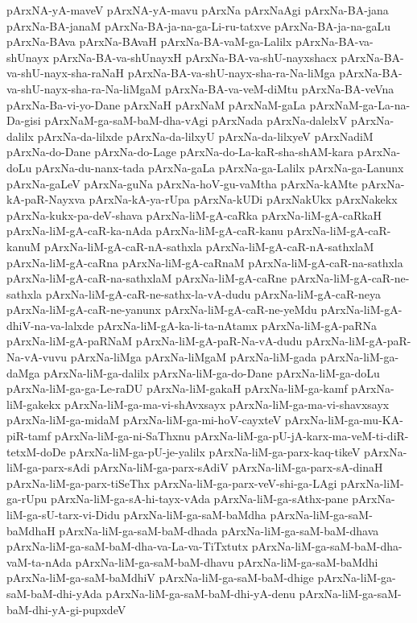 {pArxNA-yA-maveV
pArxNA-yA-mavu
pArxNa
pArxNaAgi
pArxNa-BA-jana
pArxNa-BA-janaM
pArxNa-BA-ja-na-ga-Li-ru-tatxve
pArxNa-BA-ja-na-gaLu
pArxNa-BAva
pArxNa-BAvaH
pArxNa-BA-vaM-ga-Lalilx
pArxNa-BA-va-shUnayx
pArxNa-BA-va-shUnayxH
pArxNa-BA-va-shU-nayxshacx
pArxNa-BA-va-shU-nayx-sha-raNaH
pArxNa-BA-va-shU-nayx-sha-ra-Na-liMga
pArxNa-BA-va-shU-nayx-sha-ra-Na-liMgaM
pArxNa-BA-va-veM-diMtu
pArxNa-BA-veVna
pArxNa-Ba-vi-yo-Dane
pArxNaH
pArxNaM
pArxNaM-gaLa
pArxNaM-ga-La-na-Da-gisi
pArxNaM-ga-saM-baM-dha-vAgi
pArxNada
pArxNa-dalelxV
pArxNa-dalilx
pArxNa-da-lilxde
pArxNa-da-lilxyU
pArxNa-da-lilxyeV
pArxNadiM
pArxNa-do-Dane
pArxNa-do-Lage
pArxNa-do-La-kaR-sha-shAM-kara
pArxNa-doLu
pArxNa-du-nanx-tada
pArxNa-gaLa
pArxNa-ga-Lalilx
pArxNa-ga-Lanunx
pArxNa-gaLeV
pArxNa-guNa
pArxNa-hoV-gu-vaMtha
pArxNa-kAMte
pArxNa-kA-paR-Nayxva
pArxNa-kA-ya-rUpa
pArxNa-kUDi
pArxNakUkx
pArxNakekx
pArxNa-kukx-pa-deV-shava
pArxNa-liM-gA-caRka
pArxNa-liM-gA-caRkaH
pArxNa-liM-gA-caR-ka-nAda
pArxNa-liM-gA-caR-kanu
pArxNa-liM-gA-caR-kanuM
pArxNa-liM-gA-caR-nA-sathxla
pArxNa-liM-gA-caR-nA-sathxlaM
pArxNa-liM-gA-caRna
pArxNa-liM-gA-caRnaM
pArxNa-liM-gA-caR-na-sathxla
pArxNa-liM-gA-caR-na-sathxlaM
pArxNa-liM-gA-caRne
pArxNa-liM-gA-caR-ne-sathxla
pArxNa-liM-gA-caR-ne-sathx-la-vA-dudu
pArxNa-liM-gA-caR-neya
pArxNa-liM-gA-caR-ne-yanunx
pArxNa-liM-gA-caR-ne-yeMdu
pArxNa-liM-gA-dhiV-na-va-lalxde
pArxNa-liM-gA-ka-li-ta-nAtamx
pArxNa-liM-gA-paRNa
pArxNa-liM-gA-paRNaM
pArxNa-liM-gA-paR-Na-vA-dudu
pArxNa-liM-gA-paR-Na-vA-vuvu
pArxNa-liMga
pArxNa-liMgaM
pArxNa-liM-gada
pArxNa-liM-ga-daMga
pArxNa-liM-ga-dalilx
pArxNa-liM-ga-do-Dane
pArxNa-liM-ga-doLu
pArxNa-liM-ga-ga-Le-raDU
pArxNa-liM-gakaH
pArxNa-liM-ga-kamf
pArxNa-liM-gakekx
pArxNa-liM-ga-ma-vi-shAvxsayx
pArxNa-liM-ga-ma-vi-shavxsayx
pArxNa-liM-ga-midaM
pArxNa-liM-ga-mi-hoV-cayxteV
pArxNa-liM-ga-mu-KA-piR-tamf
pArxNa-liM-ga-ni-SaThxnu
pArxNa-liM-ga-pU-jA-karx-ma-veM-ti-diR-tetxM-doDe
pArxNa-liM-ga-pU-je-yalilx
pArxNa-liM-ga-parx-kaq-tikeV
pArxNa-liM-ga-parx-sAdi
pArxNa-liM-ga-parx-sAdiV
pArxNa-liM-ga-parx-sA-dinaH
pArxNa-liM-ga-parx-tiSeThx
pArxNa-liM-ga-parx-veV-shi-ga-LAgi
pArxNa-liM-ga-rUpu
pArxNa-liM-ga-sA-hi-tayx-vAda
pArxNa-liM-ga-sAthx-pane
pArxNa-liM-ga-sU-tarx-vi-Didu
pArxNa-liM-ga-saM-baMdha
pArxNa-liM-ga-saM-baMdhaH
pArxNa-liM-ga-saM-baM-dhada
pArxNa-liM-ga-saM-baM-dhava
pArxNa-liM-ga-saM-baM-dha-va-La-va-TiTxtutx
pArxNa-liM-ga-saM-baM-dha-vaM-ta-nAda
pArxNa-liM-ga-saM-baM-dhavu
pArxNa-liM-ga-saM-baMdhi
pArxNa-liM-ga-saM-baMdhiV
pArxNa-liM-ga-saM-baM-dhige
pArxNa-liM-ga-saM-baM-dhi-yAda
pArxNa-liM-ga-saM-baM-dhi-yA-denu
pArxNa-liM-ga-saM-baM-dhi-yA-gi-pupxdeV
}
